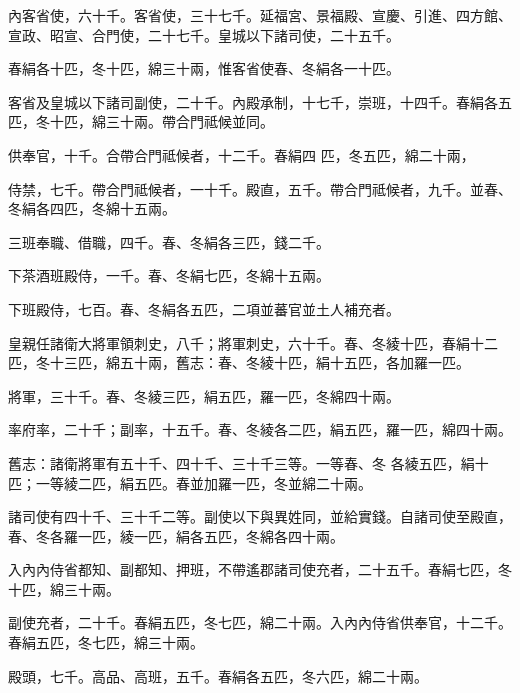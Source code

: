 \begin{pinyinscope}
 內客省使，六十千。客省使，三十七千。延福宮、景福殿、宣慶、引進、四方館、宣政、昭宣、合門使，二十七千。皇城以下諸司使，二十五千。



 春絹各十匹，冬十匹，綿三十兩，惟客省使春、冬絹各一十匹。



 客省及皇城以下諸司副使，二十千。內殿承制，十七千，崇班，十四千。春絹各五匹，冬十匹，綿三十兩。帶合門祗候並同。



 供奉官，十千。合帶合門祗候者，十二千。春絹四
 匹，冬五匹，綿二十兩，



 侍禁，七千。帶合門祗候者，一十千。殿直，五千。帶合門祗候者，九千。並春、冬絹各四匹，冬綿十五兩。



 三班奉職、借職，四千。春、冬絹各三匹，錢二千。



 下茶酒班殿侍，一千。春、冬絹七匹，冬綿十五兩。



 下班殿侍，七百。春、冬絹各五匹，二項並蕃官並土人補充者。



 皇親任諸衛大將軍領刺史，八千；將軍刺史，六十千。春、冬綾十匹，春絹十二匹，冬十三匹，綿五十兩，舊志：春、冬綾十匹，絹十五匹，各加羅一匹。



 將軍，三十千。春、冬綾三匹，絹五匹，羅一匹，冬綿四十兩。



 率府率，二十千；副率，十五千。春、冬綾各二匹，絹五匹，羅一匹，綿四十兩。



 舊志：諸衛將軍有五十千、四十千、三十千三等。一等春、冬
 各綾五匹，絹十匹；一等綾二匹，絹五匹。春並加羅一匹，冬並綿二十兩。



 諸司使有四十千、三十千二等。副使以下與異姓同，並給實錢。自諸司使至殿直，春、冬各羅一匹，綾一匹，絹各五匹，冬綿各四十兩。



 入內內侍省都知、副都知、押班，不帶遙郡諸司使充者，二十五千。春絹七匹，冬十匹，綿三十兩。



 副使充者，二十千。春絹五匹，冬七匹，綿二十兩。入內內侍省供奉官，十二千。春絹五匹，冬七匹，綿三十兩。



 殿頭，七千。高品、高班，五千。春絹各五匹，冬六匹，綿二十兩。




\end{pinyinscope}
